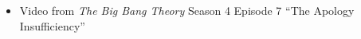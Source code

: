 \documentclass[headrule,footrule]{foils}
\begin{document}
\MyLogo{}
\begin{itemize}
\item Video from \textit{The Big Bang Theory} Season 4 Episode 7 ``The
  Apology Insufficiency'' %
\end{itemize}
  

\small



\end{document}
